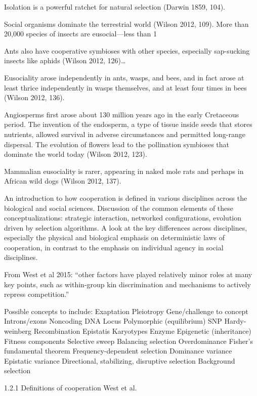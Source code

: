 \documentclass{tufte-book} %
\begin{document}
Isolation is a powerful ratchet for natural selection (Darwin 1859, 104).

Social organisms dominate the terrestrial world (Wilson 2012, 109). More than 20,000 species of insects are eusocial—less than 1%

Ants also have cooperative symbioses with other species, especially sap-sucking insects like aphids (Wilson 2012, 126)…

Eusociality arose independently in ants, wasps, and bees, and in fact arose at least thrice independently in wasps themselves, and at least four times in bees (Wilson 2012, 136). 

Angiosperms first arose about 130 million years ago in the early Cretaceous period. The invention of the endosperm, a type of tissue inside seeds that stores nutrients, allowed survival in adverse circumstances and permitted long-range dispersal. The evolution of flowers lead to the pollination symbioses that dominate the world today (Wilson 2012, 123).

Mammalian eusociality is rarer, appearing in naked mole rats and perhaps in African wild dogs (Wilson 2012, 137).  

An introduction to how cooperation is defined in various disciplines across the biological and social sciences. Discussion of the common elements of these conceptualizations: strategic interaction, networked configurations, evolution driven by selection algorithms. A look at the key differences across disciplines, especially the physical and biological emphasis on deterministic laws of cooperation, in contrast to the emphasis on individual agency in social disciplines.

From West et al 2015: “other factors have played relatively minor roles at many key points, such as within-group kin discrimination and mechanisms to actively repress competition.”

Possible concepts to include:
Exaptation
Pleiotropy
Gene/challenge to concept
Introns/exons
Noncoding DNA
Locus
Polymorphic (equilibrium)
SNP
Hardy-weinberg
Recombination
Epistatis
Karyotypes
Enzyme
Epigenetic (inheritance)
Fitness components
Selective sweep
Balancing selection
Overdominance
Fisher’s fundamental theorem
Frequency-dependent selection
Dominance variance
Epistatic variance
Directional, stabilizing, disruptive selection
Background selection

1.2.1 Definitions of cooperation
West et al. 
\end{document}
